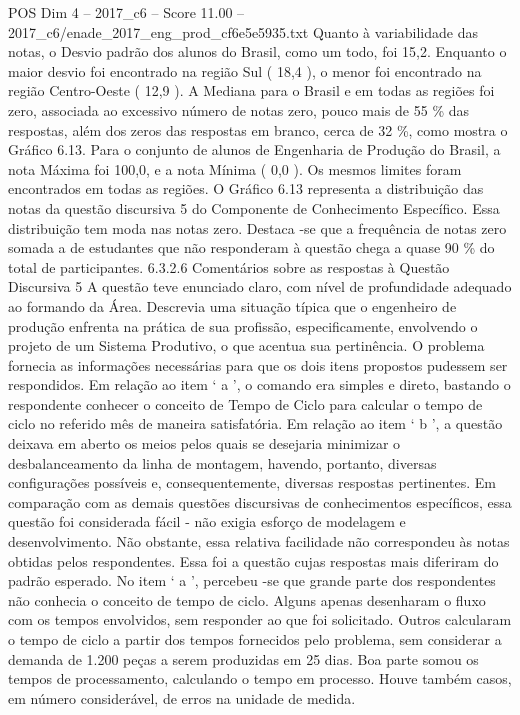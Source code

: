 \begin{textsample}{POS Dim 4 – 2017\_c6 – Score 11.00 – 2017\_c6/enade\_2017\_eng\_prod\_cf6e5e5935.txt}
Quanto à variabilidade das notas, o Desvio padrão dos alunos do Brasil, como um todo, foi 15,2.
Enquanto o maior desvio foi encontrado na região Sul ( 18,4 ), o menor foi encontrado na região Centro-Oeste ( 12,9 ).
A Mediana para o Brasil e em todas as regiões foi zero, associada ao excessivo número de notas zero, pouco mais de 55 \% das respostas, além dos zeros das respostas em branco, cerca de 32 \%, como mostra o Gráfico 6.13.
Para o conjunto de alunos de Engenharia de Produção do Brasil, a nota Máxima foi 100,0, e a nota Mínima ( 0,0 ).
Os mesmos limites foram encontrados em todas as regiões.
O Gráfico 6.13 representa a distribuição das notas da questão discursiva 5 do Componente de Conhecimento Específico.
Essa distribuição tem moda nas notas zero.
Destaca -se que a frequência de notas zero somada a de estudantes que não responderam à questão chega a quase 90 \% do total de participantes. 6.3.2.6 Comentários sobre as respostas à Questão Discursiva 5 A questão teve enunciado claro, com nível de profundidade adequado ao formando da Área.
Descrevia uma situação típica que o engenheiro de produção enfrenta na prática de sua profissão, especificamente, envolvendo o projeto de um Sistema Produtivo, o que acentua sua pertinência.
O problema fornecia as informações necessárias para que os dois itens propostos pudessem ser respondidos.
Em relação ao item ‘ a ’, o comando era simples e direto, bastando o respondente conhecer o conceito de Tempo de Ciclo para calcular o tempo de ciclo no referido mês de maneira satisfatória.
Em relação ao item ‘ b ’, a questão deixava em aberto os meios pelos quais se desejaria minimizar o desbalanceamento da linha de montagem, havendo, portanto, diversas configurações possíveis e, consequentemente, diversas respostas pertinentes.
Em comparação com as demais questões discursivas de conhecimentos específicos, essa questão foi considerada fácil - não exigia esforço de modelagem e desenvolvimento.
Não obstante, essa relativa facilidade não correspondeu às notas obtidas pelos respondentes.
Essa foi a questão cujas respostas mais diferiram do padrão esperado.
No item ‘ a ’, percebeu -se que grande parte dos respondentes não conhecia o conceito de tempo de ciclo.
Alguns apenas desenharam o fluxo com os tempos envolvidos, sem responder ao que foi solicitado.
Outros calcularam o tempo de ciclo a partir dos tempos fornecidos pelo problema, sem considerar a demanda de 1.200 peças a serem produzidas em 25 dias.
Boa parte somou os tempos de processamento, calculando o tempo em processo.
Houve também casos, em número considerável, de erros na unidade de medida.

\end{textsample}
